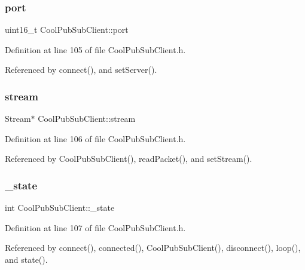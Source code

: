 \subsubsection{\texorpdfstring{port}{port}}
{\footnotesize\ttfamily uint16\+\_\+t Cool\+Pub\+Sub\+Client\+::port\hspace{0.3cm}{\ttfamily [private]}}



Definition at line 105 of file Cool\+Pub\+Sub\+Client.\+h.



Referenced by connect(), and set\+Server().

\mbox{\label{class_cool_pub_sub_client_a7a92417b317e7bd9502ed37752111705}} 
\subsubsection{\texorpdfstring{stream}{stream}}
{\footnotesize\ttfamily Stream$\ast$ Cool\+Pub\+Sub\+Client\+::stream\hspace{0.3cm}{\ttfamily [private]}}



Definition at line 106 of file Cool\+Pub\+Sub\+Client.\+h.



Referenced by Cool\+Pub\+Sub\+Client(), read\+Packet(), and set\+Stream().

\mbox{\label{class_cool_pub_sub_client_aa1953b601206252a30efa5b114eb3e1a}} 
\subsubsection{\texorpdfstring{\+\_\+state}{\_state}}
{\footnotesize\ttfamily int Cool\+Pub\+Sub\+Client\+::\+\_\+state\hspace{0.3cm}{\ttfamily [private]}}



Definition at line 107 of file Cool\+Pub\+Sub\+Client.\+h.



Referenced by connect(), connected(), Cool\+Pub\+Sub\+Client(), disconnect(), loop(), and state().

